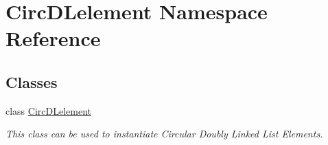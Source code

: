 \hypertarget{namespace_circ_d_lelement}{}\section{Circ\+D\+Lelement Namespace Reference}
\label{namespace_circ_d_lelement}
\subsection*{Classes}
\begin{DoxyCompactItemize}
\item 
class \hyperlink{class_circ_d_lelement_1_1_circ_d_lelement}{Circ\+D\+Lelement}
\begin{DoxyCompactList}\small\item\em This class can be used to instantiate Circular Doubly Linked List Elements. \end{DoxyCompactList}\end{DoxyCompactItemize}
